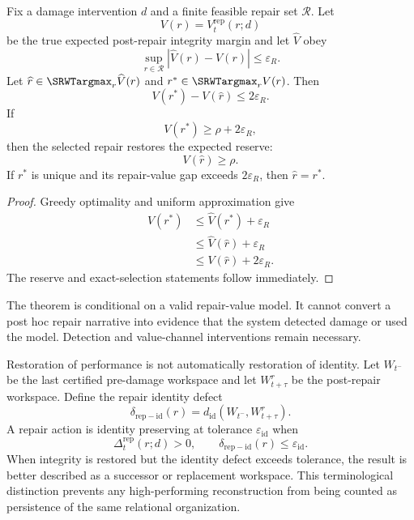 \begin{SRWTtheorem}
\label{SRWT:thm:repair-selection}
Fix a damage intervention \(d\) and a finite feasible repair set
\(\mathcal R\). Let
\[
V(r)=V_t^{\mathrm{rep}}(r;d)
\]
be the true expected post-repair integrity margin and let \(\widehat V\) obey
\[
\sup_{r\in\mathcal R}|\widehat V(r)-V(r)|
\leq
\varepsilon_R.
\]
Let \(\widehat r\in\SRWTargmax_r\widehat V(r)\) and
\(r^*\in\SRWTargmax_r V(r)\). Then
\[
\boxed{
V(r^*)-V(\widehat r)
\leq
2\varepsilon_R.
}
\]
If
\[
V(r^*)
\geq
\rho+2\varepsilon_R,
\]
then the selected repair restores the expected reserve:
\[
\boxed{V(\widehat r)\geq\rho.}
\]
If \(r^*\) is unique and its repair-value gap exceeds
\(2\varepsilon_R\), then \(\widehat r=r^*\).
\end{SRWTtheorem}

\begin{proof}
Greedy optimality and uniform approximation give
\[
\begin{aligned}
V(r^*)
&\leq
\widehat V(r^*)+\varepsilon_R\\
&\leq
\widehat V(\widehat r)+\varepsilon_R\\
&\leq
V(\widehat r)+2\varepsilon_R.
\end{aligned}
\]
The reserve and exact-selection statements follow immediately.
\end{proof}

The theorem is conditional on a valid repair-value model. It cannot convert a
post hoc repair narrative into evidence that the system detected damage or
used the model. Detection and value-channel interventions remain necessary.


Restoration of performance is not automatically restoration of identity. Let
\(W_{t^-}\) be the last certified pre-damage workspace and let
\(W_{t+\tau}^{r}\) be the post-repair workspace. Define the repair identity
defect
\[
\delta_{\mathrm{rep-id}}(r)
=
 d_{\mathrm{id}}
\left(
W_{t^-},W_{t+\tau}^{r}
\right).
\]
A repair action is identity preserving at tolerance
\(\varepsilon_{\mathrm{id}}\) when
\[
\Delta_t^{\mathrm{rep}}(r;d)>0,
\qquad
\delta_{\mathrm{rep-id}}(r)
\leq
\varepsilon_{\mathrm{id}}.
\]
When integrity is restored but the identity defect exceeds tolerance, the
result is better described as a successor or replacement workspace. This
terminological distinction prevents any high-performing reconstruction from
being counted as persistence of the same relational organization.

